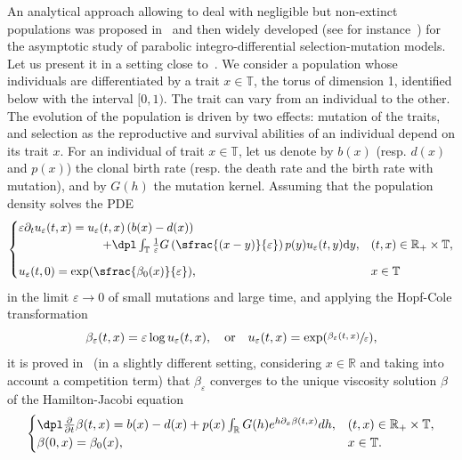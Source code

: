 \documentclass[JEP,XML,SOM,Unicode,published]{cedram}
\newcommand{\psfrac}[2]{\sfrac{(#1)}{#2}}
\theoremstyle{plain}
\theoremstyle{remark}
\newcommand\T{\mathbb{T}}
\newcommand\R{\mathbb{R}}
\begin{document}
An analytical approach allowing to deal with negligible but non-extinct populations was proposed in~\cite{diekmannjabinmischlerperthame} {and then widely developed (see for instance~\cite{BP.GB:08,Barles2009,LMP}) for the asymptotic study of parabolic integro-differential selection-mutation models}. Let us present it in a setting close to~\cite{Barles2009}. We consider a population whose individuals are differentiated by a trait $x\in \mathbb{T}$, the torus of dimension 1, identified below with the interval $[0,1)$. The trait can vary from an individual to the other.
The evolution of the population is driven by two effects: mutation of the traits, and selection as the reproductive and survival abilities of an individual depend on its trait $x$.
For an individual of trait $x\in \mathbb{T}$, let us denote by $b(x)$ (resp. $d(x)$ and $p(x)$) the clonal birth rate (resp. the death rate and the birth rate with mutation), and by $G(h)$ the mutation kernel. Assuming that the population density solves the PDE
\begin{equation}
\label{eq:PDE}
\begin{cases} \varepsilon\partial_t u_\varepsilon(t,x)=u_\varepsilon(t,x)\left(b(x)-d(x)\right) & \\
\hspace{2.5cm}+\dpl\int_{\mathbb{T}}\frac{1}{\varepsilon}G\left(\psfrac{x-y}{\varepsilon}\right)
p(y)u_\varepsilon(t,y)\mathrm dy, & (t,x)\in\R_+\times\T,\\[8pt]
u_\varepsilon(t,0)=\exp(\sfrac{\beta_0(x)}{\varepsilon}), & x\in\T
\end{cases}
\end{equation}
in the limit $\varepsilon\to 0$ of small mutations and large time, and applying the Hopf-Cole transformation
\begin{equation}
\label{eq:Hopf-Cole}
\beta_\varepsilon(t,x)=\varepsilon\log u_\varepsilon(t,x),\quad\text{or}\quad u_\varepsilon(t,x)=\exp(\sfrac{\beta_\varepsilon(t,x)}{\varepsilon}),
\end{equation}
it is proved in~\cite{Barles2009} (in a slightly different setting{, considering $x\in \R$ and taking into account a competition term}) that $\beta_\varepsilon$ converges to the unique viscosity solution $\beta$ of the Hamilton-Jacobi equation
\begin{equation}
\label{eq:HJ_intro}
\begin{cases}
\dpl\frac{\partial}{\partial t} \beta(t,x)=b(x)-d(x)+ p(x) \int_{\R} G(h)e^{h\partial_x \beta(t,x)} dh, & (t,x)\in\R_+\times\T,\\
\beta(0,x)=\beta_0(x), & x\in\T.
\end{cases}
\end{equation}
\end{document}
